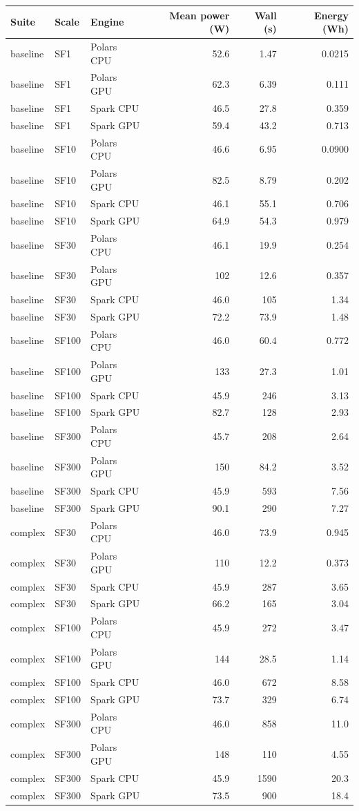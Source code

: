 \begin{longtable}{lllrrr}
\toprule
Suite & Scale & Engine & Mean power (W) & Wall (s) & Energy (Wh) \\
\midrule
\endhead
\bottomrule
\endfoot
baseline & SF1 & Polars CPU & 52.6 & 1.47 & 0.0215 \\
baseline & SF1 & Polars GPU & 62.3 & 6.39 & 0.111 \\
baseline & SF1 & Spark CPU & 46.5 & 27.8 & 0.359 \\
baseline & SF1 & Spark GPU & 59.4 & 43.2 & 0.713 \\
baseline & SF10 & Polars CPU & 46.6 & 6.95 & 0.0900 \\
baseline & SF10 & Polars GPU & 82.5 & 8.79 & 0.202 \\
baseline & SF10 & Spark CPU & 46.1 & 55.1 & 0.706 \\
baseline & SF10 & Spark GPU & 64.9 & 54.3 & 0.979 \\
baseline & SF30 & Polars CPU & 46.1 & 19.9 & 0.254 \\
baseline & SF30 & Polars GPU & 102 & 12.6 & 0.357 \\
baseline & SF30 & Spark CPU & 46.0 & 105 & 1.34 \\
baseline & SF30 & Spark GPU & 72.2 & 73.9 & 1.48 \\
baseline & SF100 & Polars CPU & 46.0 & 60.4 & 0.772 \\
baseline & SF100 & Polars GPU & 133 & 27.3 & 1.01 \\
baseline & SF100 & Spark CPU & 45.9 & 246 & 3.13 \\
baseline & SF100 & Spark GPU & 82.7 & 128 & 2.93 \\
baseline & SF300 & Polars CPU & 45.7 & 208 & 2.64 \\
baseline & SF300 & Polars GPU & 150 & 84.2 & 3.52 \\
baseline & SF300 & Spark CPU & 45.9 & 593 & 7.56 \\
baseline & SF300 & Spark GPU & 90.1 & 290 & 7.27 \\
complex & SF30 & Polars CPU & 46.0 & 73.9 & 0.945 \\
complex & SF30 & Polars GPU & 110 & 12.2 & 0.373 \\
complex & SF30 & Spark CPU & 45.9 & 287 & 3.65 \\
complex & SF30 & Spark GPU & 66.2 & 165 & 3.04 \\
complex & SF100 & Polars CPU & 45.9 & 272 & 3.47 \\
complex & SF100 & Polars GPU & 144 & 28.5 & 1.14 \\
complex & SF100 & Spark CPU & 46.0 & 672 & 8.58 \\
complex & SF100 & Spark GPU & 73.7 & 329 & 6.74 \\
complex & SF300 & Polars CPU & 46.0 & 858 & 11.0 \\
complex & SF300 & Polars GPU & 148 & 110 & 4.55 \\
complex & SF300 & Spark CPU & 45.9 & 1590 & 20.3 \\
complex & SF300 & Spark GPU & 73.5 & 900 & 18.4 \\
\end{longtable}
